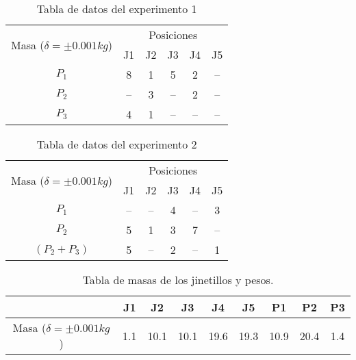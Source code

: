 \documentclass[../main.tex]{subfiles}
\begin{document}
\begin{table}[H]
    \centering
    \begin{tabular}{c|c|c|c|c|c}
        \hline
        \multirow{2}{*}{Masa ($\delta = \pm 0.001kg$)}     
         & \multicolumn{5}{c}{Posiciones}\\
        \cline{2-6}
             &  J1  &  J2  &  J3  &  J4  &  J5 \\  
        \hline
        $P_1$ &  8   &  1   &  5   &  2   &  -- \\   
        $P_2$ &  --  &  3   &  --  &  2   &  -- \\ 
        $P_3$ &  4   &  1   &  --  &  --  &  -- \\ 
        \hline
    \end{tabular}
    \label{ref:table1}
    \caption{Tabla de datos del experimento 1}
\end{table}

\begin{table}[H]
    \centering
    \begin{tabular}{c|c|c|c|c|c}
        \hline
        \multirow{2}{*}{Masa ($\delta = \pm 0.001kg$)}     
         & \multicolumn{5}{c}{Posiciones}\\
        \cline{2-6}
             &  J1  &  J2  &  J3  &  J4  &  J5 \\  
        \hline
        $P_1$ &  --  &  --   &  4  &  --  &  3 \\ 
        $P_2$ &  5   &  1    &  3  &  7   &  -- \\   
        $(P_2 + P_3)$  &  5   &  --  &  2  &  --  &  1 \\ 
        \hline
    \end{tabular}
    \label{ref:table2}
    \caption{Tabla de datos del experimento 2}
\end{table}

\begin{table}[H]
    \centering
    \begin{tabular}{c|c|c|c|c|c|c|c|c}
    \cline{2-9}
                                  &  J1   &  J2    &  J3    &  J4   &  J5  & P1   & P2   & P3\\ 
    \hline
    Masa ($\delta = \pm 0.001kg$) &  1.1  &  10.1  &  10.1  &  19.6 & 19.3 & 10.9 & 20.4 & 1.4 \\
    \hline 
    \end{tabular}
    \caption{Tabla de masas de los jinetillos y pesos.}
\end{table}
\end{document}
